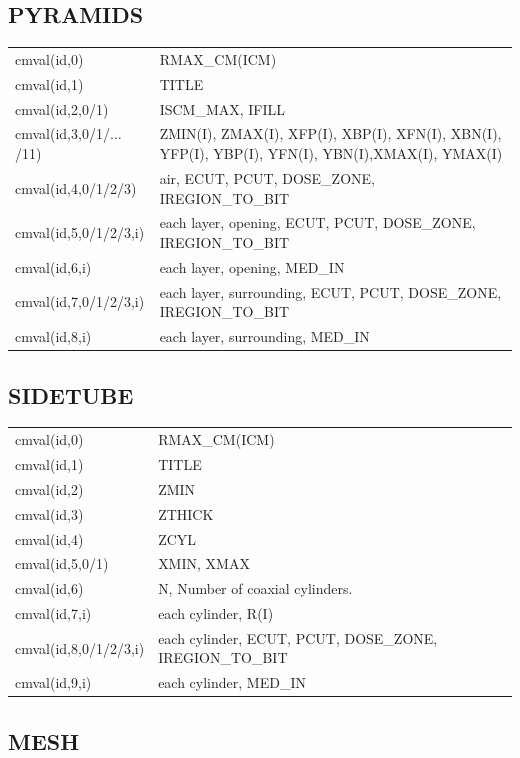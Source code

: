 \documentclass[12pt]{book}
\begin{document}
\subsection{PYRAMIDS}

\begin{tabular}{|p{4.5cm}|p{11.5cm}|}\hline
cmval(id,0) &  RMAX\_CM(ICM)\\
cmval(id,1) &  TITLE \\
cmval(id,2,0/1) &  ISCM\_MAX, IFILL \\
cmval(id,3,0/1/$\ldots$/11) &  ZMIN(I), ZMAX(I), XFP(I),
       XBP(I), XFN(I), XBN(I), YFP(I), YBP(I), YFN(I),
       YBN(I),XMAX(I), YMAX(I) \\
cmval(id,4,0/1/2/3) & air, ECUT, PCUT, DOSE\_ZONE, IREGION\_TO\_BIT \\
cmval(id,5,0/1/2/3,i) & each layer, opening, ECUT, PCUT, DOSE\_ZONE, IREGION\_TO\_BIT\\
cmval(id,6,i) & each layer, opening, MED\_IN \\
cmval(id,7,0/1/2/3,i) & each layer, surrounding, ECUT, PCUT, DOSE\_ZONE, IREGION\_TO\_BIT \\
cmval(id,8,i) &  each layer, surrounding, MED\_IN \\\hline
 \end{tabular}

\subsection{SIDETUBE}

\begin{tabular}{|p{4.5cm}|p{11.5cm}|}\hline
cmval(id,0) &  RMAX\_CM(ICM) \\
cmval(id,1) &  TITLE \\
cmval(id,2) &  ZMIN \\
cmval(id,3) &  ZTHICK \\
cmval(id,4) &  ZCYL \\
cmval(id,5,0/1) &  XMIN, XMAX \\
cmval(id,6) &  N, Number of coaxial cylinders. \\
cmval(id,7,i) &  each cylinder, R(I) \\
cmval(id,8,0/1/2/3,i) &  each cylinder, ECUT, PCUT, DOSE\_ZONE, IREGION\_TO\_BIT\\
cmval(id,9,i) &  each cylinder, MED\_IN \\\hline
\end{tabular}

\subsection{MESH}
\end{document}
